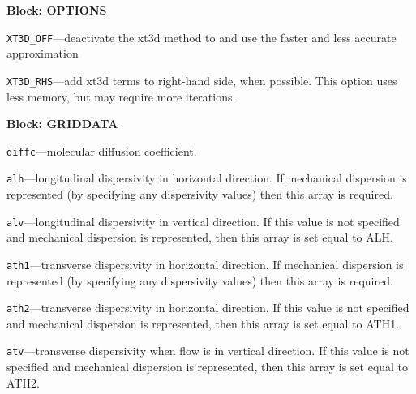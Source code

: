 
\item \textbf{Block: OPTIONS}

\begin{description}
\item \texttt{XT3D\_OFF}---deactivate the xt3d method to and use the faster and less accurate approximation

\item \texttt{XT3D\_RHS}---add xt3d terms to right-hand side, when possible.  This option uses less memory, but may require more iterations.

\end{description}
\item \textbf{Block: GRIDDATA}

\begin{description}
\item \texttt{diffc}---molecular diffusion coefficient.

\item \texttt{alh}---longitudinal dispersivity in horizontal direction.  If mechanical dispersion is represented (by specifying any dispersivity values) then this array is required.

\item \texttt{alv}---longitudinal dispersivity in vertical direction.  If this value is not specified and mechanical dispersion is represented, then this array is set equal to ALH.

\item \texttt{ath1}---transverse dispersivity in horizontal direction.  If mechanical dispersion is represented (by specifying any dispersivity values) then this array is required.

\item \texttt{ath2}---transverse dispersivity in horizontal direction.  If this value is not specified and mechanical dispersion is represented, then this array is set equal to ATH1.

\item \texttt{atv}---transverse dispersivity when flow is in vertical direction.  If this value is not specified and mechanical dispersion is represented, then this array is set equal to ATH2.

\end{description}


